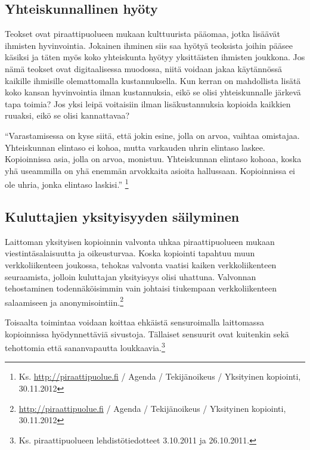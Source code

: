 \documentclass[titlepage,12pt]{article}
\begin{document}
\subsection{Yhteiskunnallinen hyöty}



Teokset ovat piraattipuolueen mukaan kulttuurista pääomaa, jotka
lisäävät ihmisten hyvinvointia.  Jokainen ihminen siis saa hyötyä
teoksista joihin pääsee käsiksi ja täten myös koko yhteiskunta hyötyy
yksittäisten ihmisten joukkona.  Jos nämä teokset ovat digitaalisessa
muodossa, niitä voidaan jakaa käytännössä kaikille ihmisille
olemattomalla kustannuksella.  Kun kerran on mahdollista lisätä koko
kansan hyvinvointia ilman kustannuksia, eikö se olisi yhteiskunnalle
järkevä tapa toimia?  Jos yksi leipä voitaisiin ilman lisäkustannuksia
kopioida kaikkien ruuaksi, eikö se olisi kannattavaa?

``Varastamisessa on kyse siitä, että jokin esine, jolla on arvoa,
vaihtaa omistajaa.  Yhteiskunnan elintaso ei kohoa, mutta varkauden
uhrin elintaso laskee. Kopioinnissa asia, jolla on arvoa, monistuu.
Yhteiskunnan elintaso kohoaa, koska yhä useammilla on yhä enemmän
arvokkaita asioita hallussaan.  Kopioinnissa ei ole uhria, jonka
elintaso laskisi.'' \footnote{Ks. \url{http://piraattipuolue.fi} /
  Agenda / Tekijänoikeus / Yksityinen kopiointi, 30.11.2012}

\subsection{Kuluttajien yksityisyyden säilyminen}

Laittoman yksityisen kopioinnin valvonta uhkaa piraattipuolueen mukaan
viestintäsalaisuutta ja oikeusturvaa.  Koska kopiointi tapahtuu muun
verkkoliikenteen joukossa, tehokas valvonta vaatisi kaiken
verkkoliikenteen seuraamista, jolloin kuluttajan yksityisyys olisi
uhattuna.  Valvonnan tehostaminen todennäköisimmin vain johtaisi
tiukempaan verkkoliikenteen salaamiseen ja
anonymisointiin.\footnote{\url{http://piraattipuolue.fi} / Agenda /
  Tekijänoikeus / Yksityinen kopiointi, 30.11.2012}

Toisaalta toimintaa voidaan koittaa ehkäistä sensuroimalla laittomassa
kopioinnissa hyödynnettäviä sivustoja. %
Tällaiset sensuurit ovat kuitenkin sekä tehottomia että sananvapautta
loukkaavia.\footnote{Ks. piraattipuolueen lehdistötiedotteet 3.10.2011
  ja 26.10.2011.}
\end{document}
